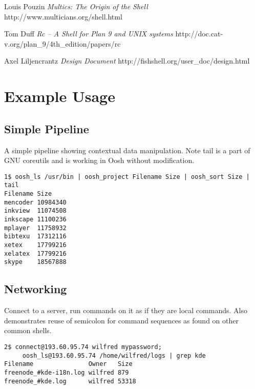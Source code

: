 \documentclass[12pt,twoside,notitlepage]{report}
\begin{document}
\cleardoublepage


\begin{thebibliography}{5} %

  Louis Pouzin
  \emph{Multics: The Origin of the Shell}
  http://www.multicians.org/shell.html

  Tom Duff
  \emph{Rc -- A Shell for Plan 9 and UNIX systems}
  http://doc.cat-v.org/plan\_9/4th\_edition/papers/rc

  Axel Liljencrantz
  \emph{Design Document}
  http://fishshell.org/user\_doc/design.html

\end{thebibliography}
\cleardoublepage

\appendix

\chapter{Example Usage}
\label{examples}

\section{Simple Pipeline}
\label{lsexample}
A simple pipeline showing contextual data manipulation. Note tail is a part of
GNU coreutils and is working in Oosh without modification.
\begin{verbatim}
1$ oosh_ls /usr/bin | oosh_project Filename Size | oosh_sort Size | tail
Filename Size
mencoder 10984340
inkview  11074508
inkscape 11100236
mplayer  11758932
bibtexu  17312116
xetex    17799216
xelatex  17799216
skype    18567888
\end{verbatim}

\section{Networking}
Connect to a server, run commands on it as if they are local commands. Also
demonstrates reuse of semicolon for command sequences as found on other common
shells.
\begin{verbatim}
2$ connect@193.60.95.74 wilfred mypassword;
     oosh_ls@193.60.95.74 /home/wilfred/logs | grep kde
Filename               Owner   Size
freenode_#kde-i18n.log wilfred 879
freenode_#kde.log      wilfred 53318
\end{verbatim}
\end{document}
